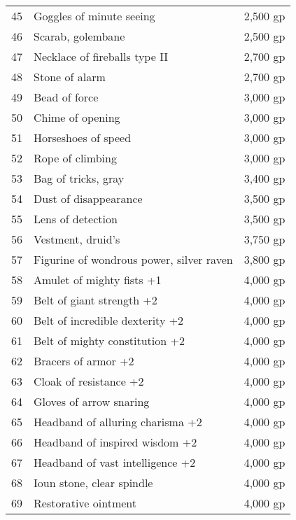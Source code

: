 \begin{table}[]
\begin{tabular}{lll}
45  & Goggles of minute seeing                    & 2,500 gp     \\
46  & Scarab, golembane                           & 2,500 gp     \\
47  & Necklace of fireballs type II               & 2,700 gp     \\
48  & Stone of alarm                              & 2,700 gp     \\
49  & Bead of force                               & 3,000 gp     \\
50  & Chime of opening                            & 3,000 gp     \\
51  & Horseshoes of speed                         & 3,000 gp     \\
52  & Rope of climbing                            & 3,000 gp     \\
53  & Bag of tricks, gray                         & 3,400 gp     \\
54  & Dust of disappearance                       & 3,500 gp     \\
55  & Lens of detection                           & 3,500 gp     \\
56  & Vestment, druid's                           & 3,750 gp     \\
57  & Figurine of wondrous power, silver raven    & 3,800 gp     \\
58  & Amulet of mighty fists +1                   & 4,000 gp     \\
59  & Belt of giant strength +2                   & 4,000 gp     \\
60  & Belt of incredible dexterity +2             & 4,000 gp     \\
61  & Belt of mighty constitution +2              & 4,000 gp     \\
62  & Bracers of armor +2                         & 4,000 gp     \\
63  & Cloak of resistance +2                      & 4,000 gp     \\
64  & Gloves of arrow snaring                     & 4,000 gp     \\
65  & Headband of alluring charisma +2            & 4,000 gp     \\
66  & Headband of inspired wisdom +2              & 4,000 gp     \\
67  & Headband of vast intelligence +2            & 4,000 gp     \\
68  & Ioun stone, clear spindle                   & 4,000 gp     \\
69  & Restorative ointment                        & 4,000 gp     \\

\end{tabular}
\end{table}
